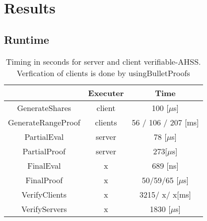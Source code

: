 \chapter{Results}

\label{ch:results}
\section{Runtime}

\begin{table}
\label{tab:BenchBP}
\caption{Timing in seconds for server and client verifiable-AHSS. Verfication of clients is done by usingBulletProofs}
\begin{center}
\begin{tabular}{*{3}{c}}
\hline
    										&  \textbf{Executer}   & \textbf{Time}    		\\ \hline
  GenerateShares 				&  client  					&   100 [$\mu$s]																	\\ \hline 
  GenerateRangeProof  		&  clients  					&   56 /	106 /  207 [ms]												\\ \hline 
  PartialEval  						&  server  					&   78	[$\mu$s]																\\ \hline 
  PartialProof 					&  server 					&   273[$\mu$s]														\\ \hline 
  FinalEval  						&  x  							&   689 [ns]					 													\\ \hline 
  FinalProof  						&  x 							&   50/59/65	[$\mu$s]																\\ \hline 
  VerifyClients 					&  x 							&   3215/ x/ x[ms]																	\\ \hline 
  VerifyServers					&  x 							&   1830 [$\mu$s]															\\ \hline 
\end{tabular}
\end{center}
 \end{table}